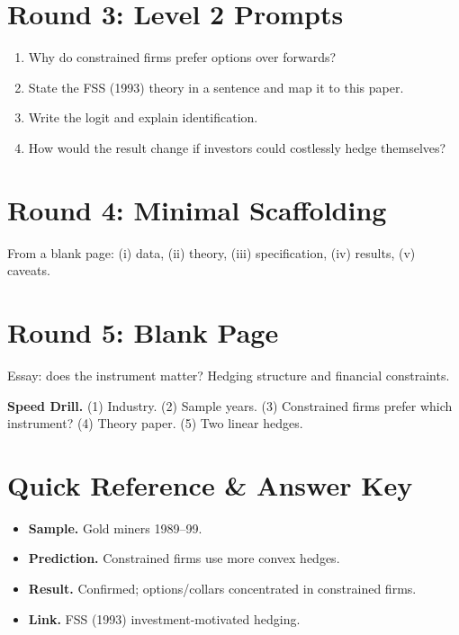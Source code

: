\documentclass[11pt]{article}
\begin{document}
\section*{Round 3: Level 2 Prompts}
\begin{enumerate}
\item Why do constrained firms prefer options over forwards?
\item State the FSS (1993) theory in a sentence and map it to this paper.
\item Write the logit and explain identification.
\item How would the result change if investors could costlessly hedge themselves?
\end{enumerate}

\section*{Round 4: Minimal Scaffolding}
From a blank page: (i) data, (ii) theory, (iii) specification, (iv) results, (v) caveats.

\section*{Round 5: Blank Page}
Essay: does the instrument matter? Hedging structure and financial constraints.

\vspace{6pt}
\begin{drillbox}
\textbf{Speed Drill.} (1) Industry. (2) Sample years. (3) Constrained firms prefer which instrument? (4) Theory paper. (5) Two linear hedges.
\end{drillbox}

\section*{Quick Reference \& Answer Key}
\begin{answerbox}
\begin{itemize}
\item \textbf{Sample.} Gold miners 1989--99.
\item \textbf{Prediction.} Constrained firms use more convex hedges.
\item \textbf{Result.} Confirmed; options/collars concentrated in constrained firms.
\item \textbf{Link.} FSS (1993) investment-motivated hedging.
\end{itemize}
\end{answerbox}
\end{document}

